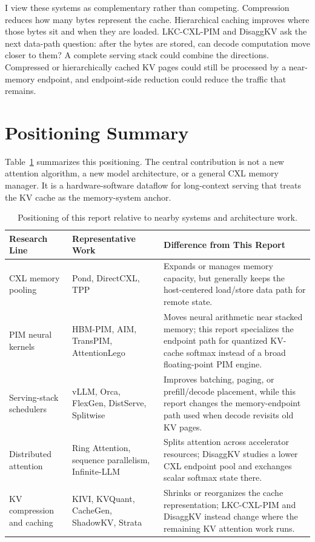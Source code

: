 I view these systems as complementary rather than competing. Compression reduces how many bytes represent the cache. Hierarchical caching improves where those bytes sit and when they are loaded. LKC-CXL-PIM and DisaggKV ask the next data-path question: after the bytes are stored, can decode computation move closer to them? A complete serving stack could combine the directions. Compressed or hierarchically cached KV pages could still be processed by a near-memory endpoint, and endpoint-side reduction could reduce the traffic that remains.

\section{Positioning Summary}

Table~\ref{tab:related_positioning} summarizes this positioning. The central contribution is not a new attention algorithm, a new model architecture, or a general CXL memory manager. It is a hardware-software dataflow for long-context serving that treats the KV cache as the memory-system anchor.

\begin{table}[htbp]
\centering
\caption[Positioning against related work]{Positioning of this report relative to nearby systems and architecture work.}
\label{tab:related_positioning}
\small
\begin{tabularx}{\textwidth}{>{\raggedright\arraybackslash}p{}>{\raggedright\arraybackslash}p{}>{\raggedright\arraybackslash}X}
\toprule
\textbf{Research Line} & \textbf{Representative Work} & \textbf{Difference from This Report} \\
\midrule
CXL memory pooling & Pond, DirectCXL, TPP & Expands or manages memory capacity, but generally keeps the host-centered load/store data path for remote state. \\
PIM neural kernels & HBM-PIM, AIM, TransPIM, AttentionLego & Moves neural arithmetic near stacked memory; this report specializes the endpoint path for quantized KV-cache softmax instead of a broad floating-point PIM engine. \\
Serving-stack schedulers & vLLM, Orca, FlexGen, DistServe, Splitwise & Improves batching, paging, or prefill/decode placement, while this report changes the memory-endpoint path used when decode revisits old KV pages. \\
Distributed attention & Ring Attention, sequence parallelism, Infinite-LLM & Splits attention across accelerator resources; DisaggKV studies a lower CXL endpoint pool and exchanges scalar softmax state there. \\
KV compression and caching & KIVI, KVQuant, CacheGen, ShadowKV, Strata & Shrinks or reorganizes the cache representation; LKC-CXL-PIM and DisaggKV instead change where the remaining KV attention work runs. \\
\bottomrule
\end{tabularx}
\end{table}
